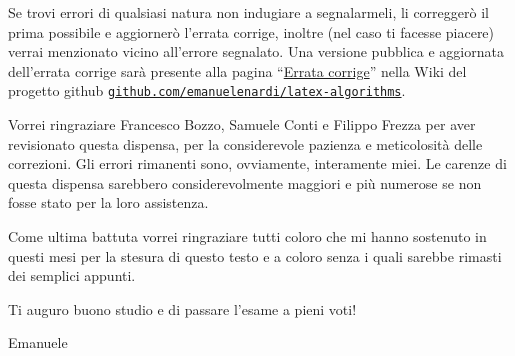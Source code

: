 Se trovi errori di qualsiasi natura non indugiare a segnalarmeli, li correggerò il prima possibile e aggiornerò l'errata corrige, inoltre (nel caso ti facesse piacere) verrai menzionato vicino all'errore segnalato.
Una versione pubblica e aggiornata dell'errata corrige sarà presente alla pagina \enquote{\href{https://github.com/emanuelenardi/latex-algorithms/wiki/Errata-corrige}{Errata corrige}} nella Wiki del progetto github \href{https://github.com/emanuelenardi/latex-algorithms/wiki/Errata-corrige}{\texttt{github.com/emanuelenardi/latex-algorithms}}.

Vorrei ringraziare Francesco Bozzo, Samuele Conti e Filippo Frezza per aver revisionato questa dispensa, per la considerevole pazienza e meticolosità delle correzioni.
Gli errori rimanenti sono, ovviamente, interamente miei.
Le carenze di questa dispensa sarebbero considerevolmente maggiori e più numerose se non fosse stato per la loro assistenza.

Come ultima battuta vorrei ringraziare tutti coloro che mi hanno sostenuto in questi mesi per la stesura di questo testo e a coloro senza i quali sarebbe rimasti dei semplici appunti.

Ti auguro buono studio e di passare l'esame a pieni voti!

Emanuele

